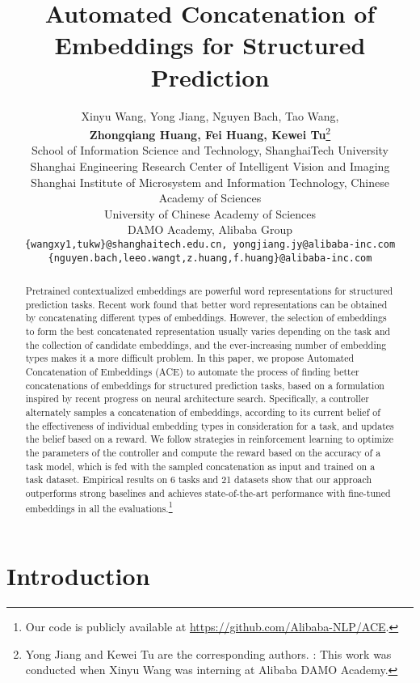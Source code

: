 \documentclass[11pt,a4paper]{article}
\title{Automated Concatenation of Embeddings for Structured Prediction}
\author{Xinyu Wang, Yong Jiang\textsuperscript{}, Nguyen Bach, Tao Wang,\\
\textbf{Zhongqiang Huang, Fei Huang,  Kewei Tu}\thanks{\hspace{1mm} Yong Jiang and Kewei Tu are the corresponding authors. : This work was conducted when Xinyu Wang was interning at Alibaba DAMO Academy. } \\
 School of Information Science and Technology, ShanghaiTech University \\
 Shanghai Engineering Research Center of Intelligent Vision and Imaging \\
  Shanghai Institute of Microsystem and Information Technology, Chinese Academy of Sciences \\
 University of Chinese Academy of Sciences \\
 DAMO Academy, Alibaba Group \\
  {\tt \{wangxy1,tukw\}@shanghaitech.edu.cn, yongjiang.jy@alibaba-inc.com} \\
  {\tt \{nguyen.bach,leeo.wangt,z.huang,f.huang\}@alibaba-inc.com} \\
}
\date{}
\begin{document}
\maketitle

\begin{abstract}
Pretrained contextualized embeddings are powerful word representations for structured prediction tasks. Recent work found that better word representations can be obtained by concatenating different types of embeddings. However, the selection of embeddings to form the best concatenated representation usually varies depending on the task and the collection of candidate embeddings, and the ever-increasing number of embedding types makes it a more difficult problem. In this paper, we propose Automated Concatenation of Embeddings (ACE) to automate the process of finding better concatenations of embeddings for structured prediction tasks, based on a formulation inspired by recent progress on neural architecture search. Specifically, a controller alternately samples a concatenation of embeddings, according to its current belief of the effectiveness of individual embedding types in consideration for a task, and updates the belief based on a reward. We follow strategies in reinforcement learning to optimize the parameters of the controller and compute the reward based on the accuracy of a task model, which is fed with the sampled concatenation as input and trained on a task dataset. Empirical results on 6 tasks and 21 datasets show that our approach outperforms strong baselines and achieves state-of-the-art performance with fine-tuned embeddings in all the evaluations.\footnote{Our code is publicly available at \url{https://github.com/Alibaba-NLP/ACE}.}




\end{abstract}

\section{Introduction}
\end{document}

